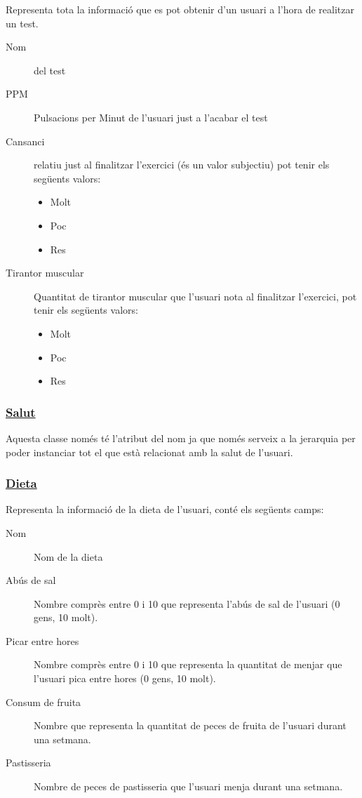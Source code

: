 \documentclass[a4paper, 12pt, UTF8]{article}
\begin{document}
Representa tota la informació que es pot obtenir d'un usuari a l'hora de realitzar un test.

\begin{description}
	\item[Nom] del test
	\item[PPM] Pulsacions per Minut de l'usuari just a l'acabar el test
	\item[Cansanci] relatiu just al finalitzar l'exercici (és un valor subjectiu) pot tenir els següents valors:
	\begin{itemize}
		\item Molt
		\item Poc
		\item Res
	\end{itemize}
	\item[Tirantor muscular] Quantitat de tirantor muscular que l'usuari nota al finalitzar l'exercici, pot tenir els següents valors:
	\begin{itemize}
		\item Molt
		\item Poc
		\item Res
	\end{itemize}
\end{description}

\subsubsection*{\underline{Salut}}

Aquesta classe només té l'atribut del nom ja que només serveix a la jerarquia per poder instanciar tot el que està relacionat amb la salut de l'usuari.  

\subsubsection*{\underline{Dieta}}

Representa la informació de la dieta de l'usuari, conté els següents camps:

\begin{description}
	\item[Nom] Nom de la dieta
	\item[Abús de sal] Nombre comprès entre 0 i 10 que representa l'abús de sal de l'usuari (0 gens, 10 molt).
	\item[Picar entre hores] Nombre comprès entre 0 i 10 que representa la quantitat de menjar que l'usuari pica entre hores (0 gens, 10 molt).
	\item[Consum de fruita] Nombre que representa la quantitat de peces de fruita de l'usuari durant una setmana.
	\item[Pastisseria] Nombre de peces de pastisseria que l'usuari menja durant una setmana.
\end{description}
\end{document}

